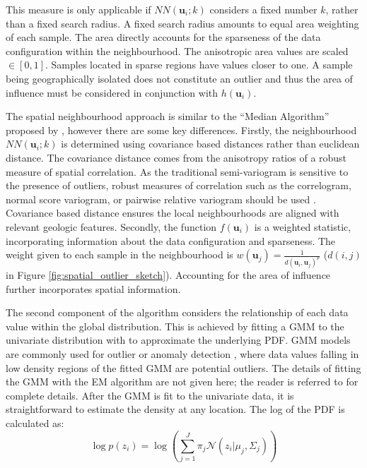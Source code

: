 This measure is only applicable if $NN(\mathbf{u}_{i}; k)$ considers a fixed number $k$, rather than a fixed search radius. A fixed search radius amounts to equal area weighting of each sample. The area directly accounts for the sparseness of the data configuration within the neighbourhood. The anisotropic area values are scaled $\in [0,1]$. Samples located in sparse regions have values closer to one. A sample being geographically isolated does not constitute an outlier and thus the area of influence must be considered in conjunction with $h(\mathbf{u}_{i})$.

The spatial neighbourhood approach is similar to the ``Median Algorithm'' proposed by \cite{chen2008detecting}, however there are some key differences. Firstly, the neighbourhood $NN(\mathbf{u}_{i}; k)$ is determined using covariance based distances rather than euclidean distance. The covariance distance comes from the anisotropy ratios of a robust measure of spatial correlation. As the traditional semi-variogram is sensitive to the presence of outliers, robust measures of correlation such as the correlogram, normal score variogram, or pairwise relative variogram should be used \citep{babakhani2014geostatistical,drumond2019using}. Covariance based distance ensures the local neighbourhoods are aligned with relevant geologic features. Secondly, the function $f(\mathbf{u}_{i})$ is a weighted statistic, incorporating information about the data configuration and sparseness. The weight given to each sample in the neighbourhood is $w(\mathbf{u}_{j})=\frac{1}{d(\mathbf{u}_{i},\mathbf{u}_{j})^{p}}$ ($d(i,j)$ in Figure \ref{fig:spatial_outlier_sketch}). Accounting for the area of influence further incorporates spatial information.

The second component of the algorithm considers the relationship of each data value within the global distribution. This is achieved by fitting a \gls{GMM} to the univariate distribution with to approximate the underlying \gls{PDF}. \Gls{GMM} models are commonly used for outlier or anomaly detection \citep{geron2019hands,qu2021anomaly}, where data values falling in low density regions of the fitted \gls{GMM} are potential outliers. The details of fitting the \gls{GMM} with the \gls{EM} algorithm are not given here; the reader is referred to \cite{mclachlan2019finite} for complete details. After the \gls{GMM} is fit to the univariate data, it is straightforward to estimate the density at any location. The log of the \gls{PDF} is calculated as:
\begin{equation}
    \log p(z_{i}) = \log \left( \sum_{j=1}^{J} \pi_{j} \mathcal{N}(z_{i}|\mu_{j}, \Sigma_{j}) \right)
    \label{eq:logprob}
\end{equation}

